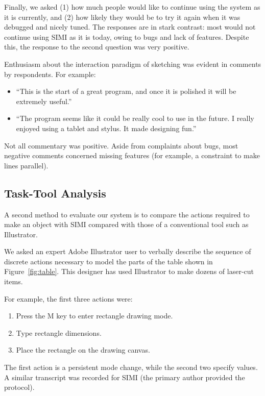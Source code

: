 \documentclass{article}
\begin{document}
Finally, we asked (1) how much people would like to continue using the
system as it is currently, and (2) how likely they would be to try it
again when it was debugged and nicely tuned. The responses are in
stark contrast: most would not continue using SIMI as it is today,
owing to bugs and lack of features. Despite this, the response to the
second question was very positive.

Enthusiasm about the interaction paradigm of sketching was evident in
comments by respondents. For example:

\begin{itemize}
\item ``This is the start of a great program, and once it is polished it
  will be extremely useful.''
\item ``The program seems like it could be really cool to use in the
  future. I really enjoyed using a tablet and stylus. It made
  designing fun.''
\end{itemize}

Not all commentary was positive. Aside from complaints about bugs,
most negative comments concerned missing features (for example, a
constraint to make lines parallel).

\subsection{Task-Tool Analysis}

A second method to evaluate our system is to compare the actions
required to make an object with SIMI compared with those of a
conventional tool such as Illustrator.

We asked an expert Adobe Illustrator user to verbally describe the
sequence of discrete actions necessary to model the parts of the table
shown in Figure~\ref{fig:table}. This designer has used Illustrator to
make dozens of laser-cut items.

\begin{samepage}
For example, the first three actions were:

\begin{enumerate}
\item Press the M key to enter rectangle drawing mode.
\item Type rectangle dimensions.
\item Place the rectangle on the drawing canvas.
\end{enumerate}
\end{samepage}

The first action is a persistent mode change, while the second two
specify values. A similar transcript was recorded for SIMI (the
primary author provided the protocol).
\end{document}
